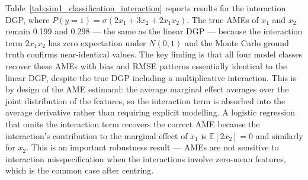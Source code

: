 \documentclass[12pt,a4paper]{article}
\numberwithin{equation}{section}
\theoremstyle{plain}
\theoremstyle{definition}
\begin{document}
	Table~\ref{tab:sim1_classification_interaction} reports results for the interaction DGP, where $P(y=1) = \sigma(2x_1 + 3x_2 + 2x_1 x_2)$. The true AMEs of $x_1$ and $x_2$ remain 0.199 and 0.298 --- the same as the linear DGP --- because the interaction term $2x_1 x_2$ has zero expectation under $N(0,1)$ and the Monte Carlo ground truth confirms near-identical values. The key finding is that all four model classes recover these AMEs with bias and RMSE patterns essentially identical to the linear DGP, despite the true DGP including a multiplicative interaction. This is by design of the AME estimand: the average marginal effect averages over the joint distribution of the features, so the interaction term is absorbed into the average derivative rather than requiring explicit modelling. A logistic regression that omits the interaction term recovers the correct AME because the interaction's contribution to the marginal effect of $x_1$ is $\mathbb{E}[2x_2] = 0$ and similarly for $x_2$. This is an important robustness result --- AMEs are not sensitive to interaction misspecification when the interactions involve zero-mean features, which is the common case after centring.
	
\end{document}
